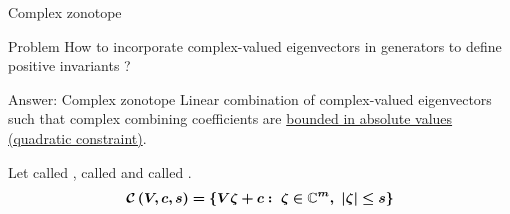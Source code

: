 \begin{frame}{Complex zonotope}

\begin{alertblock}{Problem}
{\color{purple} How to incorporate} {\color{blue} complex-valued eigenvectors} in
{\color{purple} generators to define} {\color{blue} positive invariants ?}
\end{alertblock}
%
\pause
%
\begin{block}{Answer: Complex zonotope}
{\color{blue} Linear combination} of
{\color{blue} complex-valued eigenvectors} such that {\color{blue}
complex combining coefficients} are \underline{{\color{purple} bounded in absolute
values (quadratic constraint)}}.
\end{block}
%
\begin{block}{}
Let  called ,
 called  and 
called .
%
{\color{black}
\[
\bm{
\mathcal{C}\left(V,c,s\right)=\left\{V\zeta+c:~\zeta\in\mathbb{C}^m,~\left|\zeta\right|\leq
s\right\}
}
\]
}
\end{block}
%
\end{frame}

